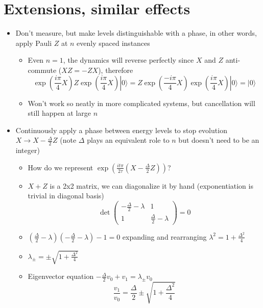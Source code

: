 \documentclass[english]{article}
\newcommand{\ket}[1]{|#1 \rangle}
\begin{document}
\section{Extensions, similar effects}


\begin{itemize}
\item Don't measure, but make levels distinguishable with a phase, in other words, apply Pauli $Z$ at $n$ evenly spaced instances
\begin{itemize}
\item Even $n=1$, the dynamics will reverse perfectly since $X$ and $Z$ anti-commute ($XZ=-ZX$), therefore  
\begin{equation}
\exp\left(\frac{i \pi }{4} X\right)Z\exp\left(\frac{i \pi }{4} X\right)\ket{0}=Z\exp\left(\frac{-i \pi }{4} X\right)\exp\left(\frac{i \pi }{4} X\right)\ket{0}=\ket{0}
\end{equation}
\item Won't work so neatly in more complicated systems, but cancellation will still happen at large $n$
\end{itemize}
\item Continuously apply a phase between energy levels to stop evolution $X \rightarrow X-\frac{\Delta}{2} Z$ (note $\Delta$ plays an equivalent role to $n$ but doesn't need to be an integer)
\begin{itemize}
\item How do we represent $\exp\left(\frac{i t \pi }{2 \tau} (X-\frac{\Delta}{2} Z)\right)$?
\item $X+Z$ is a 2x2 matrix, we can diagonalize it by hand (exponentiation is trivial in diagonal basis)
\begin{equation}
\det\left(\begin{array}{cc} -\frac{\Delta}{2}-\lambda & 1 \\ 1 & \frac{\Delta}{2}-\lambda \end{array}\right)=0
\end{equation}
\item $(\frac{\Delta}{2}-\lambda)(-\frac{\Delta}{2}-\lambda)-1=0$ expanding and rearranging $\lambda^2=1+\frac{\Delta^2}{4}$
\item $\lambda_{\pm}=\pm\sqrt{1+\frac{\Delta^2}{4}}$
\item Eigenvector equation $-\frac{\Delta}{2}v_0+v_1=\lambda_{\pm}v_0$
\begin{equation}
\frac{v_1}{v_0}=\frac{\Delta}{2}\pm\sqrt{1+\frac{\Delta^2}{4}}
\end{equation}

\end{itemize}
\end{itemize}
\end{document}

